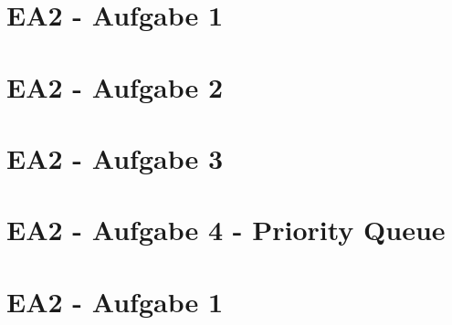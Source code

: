\documentclass[12pt]{article}
\begin{document}
\section*{EA2 - Aufgabe 1}
\section*{EA2 - Aufgabe 2}
\section*{EA2 - Aufgabe 3}
\section*{EA2 - Aufgabe 4 - Priority Queue} 


\section*{EA2 - Aufgabe 1}


\end{document}
